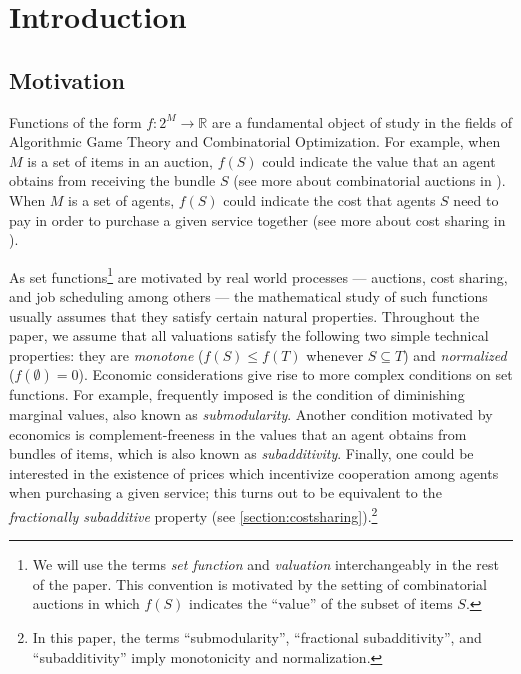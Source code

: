 \documentclass[11pt]{article}\usepackage{amsfonts}
\numberwithin{theorem}{subsection}
\begin{document}
\addtocounter{page}{-1}
\newpage
\section{Introduction}\label{sec:intro}
\label{section:intro}
\subsection{Motivation}
Functions of the form $f:2^M\longrightarrow \mathbb{R}$ are a fundamental object of study in the fields of Algorithmic Game Theory and Combinatorial Optimization. For example, when $M$ is a set of items in an auction, $f(S)$ could indicate the value that an agent obtains from receiving the bundle $S$ (see more about combinatorial auctions in \cite[Chapter 11]{AGTbook}). When $M$ is a set of agents, $f(S)$ could indicate the cost that agents $S$ need to pay in order to purchase a given service together (see more about cost sharing in \cite[Chapter 15]{AGTbook}).



As set functions\footnote{We will use the terms \textit{set function} and \textit{valuation} interchangeably in the rest of the paper. This convention is motivated by the setting of combinatorial auctions in which $f(S)$ indicates the ``value'' of the subset of items $S.$} are motivated by real world processes --- auctions, cost sharing, and job scheduling among others --- the mathematical study of such functions usually assumes that they satisfy certain natural properties. Throughout the paper, we assume that all valuations satisfy the following two simple technical properties: they are \textit{monotone} ($f(S)\le f(T)$ whenever $S\subseteq T$) and \textit{normalized} ($f(\emptyset) = 0$). Economic considerations give rise to more complex conditions on set functions.
For example, frequently imposed is the condition of diminishing marginal values, also known as \textit{submodularity}. Another condition motivated by economics is complement-freeness in the values that an agent obtains from bundles of items, which is also known as \textit{subadditivity}. Finally, one could be interested in the existence of prices which incentivize cooperation among agents when purchasing a given service; this turns out to be equivalent to the \textit{fractionally subadditive} property (see \cref{section:costsharing}).\footnote{In this paper, the terms ``submodularity'', ``fractional subadditivity'', and ``subadditivity'' imply monotonicity and normalization.}
\end{document}
